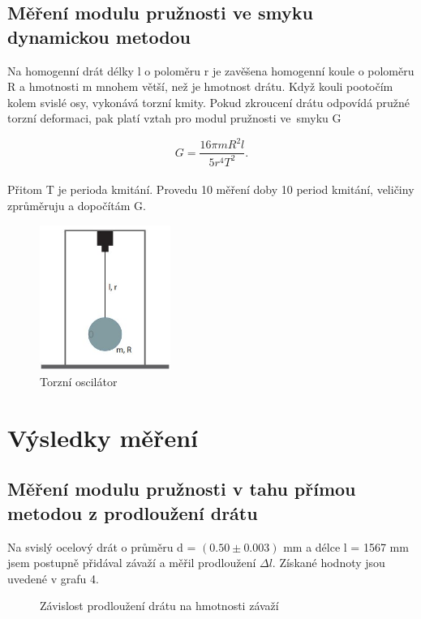 \documentclass[a4paper,11pt]{article}
\begin{document}
\subsection{Měření modulu pružnosti ve smyku dynamickou metodou}

Na homogenní drát délky l o poloměru r je zavěšena homogenní koule o poloměru R a hmotnosti m mnohem větší, než je hmotnost drátu. Když kouli pootočím kolem svislé osy, vykonává torzní kmity. Pokud zkroucení drátu odpovídá pružné torzní deformaci, pak platí vztah pro modul pružnosti ve~smyku G

\begin{equation}
  G = \frac{16 \pi m R^2 l}{5 r^{4} T^{2}}.
\end{equation}
\\
Přitom T je perioda kmitání. Provedu 10 měření doby 10 period kmitání, veličiny zprůměruju a dopočítám G.

\begin{figure}[htpb]
  \centering
  \includegraphics[width=0.38\textwidth]{oscilator.jpg}
  \caption{Torzní oscilátor}
\end{figure}

\section{Výsledky měření}

\subsection{Měření modulu pružnosti v tahu přímou metodou z prodloužení drátu}

Na svislý ocelový drát o průměru d = $(0.50 \pm 0.003)$ mm a délce l = 1567 mm jsem postupně přidával závaží a měřil prodloužení $\Delta l$. Získané hodnoty jsou uvedené v grafu 4.

\begin{figure}[htpb]
  \centering
  
  \caption{Závislost prodloužení drátu na hmotnosti závaží}
\end{figure}
\end{document}
